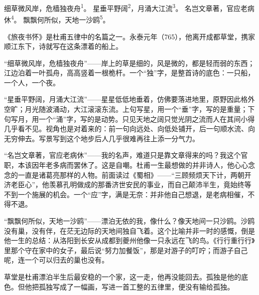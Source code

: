 
\begin{poem}
细草微风岸，危樯独夜舟\textsuperscript{1}。
星垂平野阔\textsuperscript{2}，月涌大江流\textsuperscript{3}。
名岂文章著，官应老病休\textsuperscript{4}。
飘飘何所似，天地一沙鸥\textsuperscript{5}。
\end{poem}

\begin{annotations}
\end{annotations}

\begin{appreciation}
《旅夜书怀》是杜甫五律中的名篇之一。永泰元年（765），他离开成都草堂，携家顺江东下，诗就写在这条漂着的船上。

“细草微风岸，危樯独夜舟”——岸上的草是细的，风是微的，都是轻而弱的东西；江边泊着一叶孤舟，高高竖着一根桅杆。一个“独”字，是整首诗的底色：一只船，一个人，一个夜。

“星垂平野阔，月涌大江流”——星星低低地垂着，仿佛要落进地里，原野因此格外空旷；月光随波涌动，大江滚滚东流。上句写星，用一个“垂”字，写的是重量；下句写月，用一个“涌”字，写的是动势。只见天地之阔只觉光阴之流而人在其间小得几乎看不见。视角也是对着来的：前一句向远处、向低处铺开，后一句顺水流、向无穷伸去。写景写到这个地步后人几乎很难再往上添一分气力。

“名岂文章著，官应老病休”——我的名声，难道只是靠文章得来的吗？我这个官职，本该因年老多病而罢休了。这是自嘲。杜甫一生最想做的并非诗人，他心心念念的一直是诸葛亮那样的人物。前面读过《蜀相》——“三顾频烦天下计，两朝开济老臣心”，他羡慕孔明做成的那番济世安民的事业，而自己颠沛半生，竟始终等不到一个施展的机会。一个“应”字，满是无奈：并非他自己想退，是老病相催，不得不退。

“飘飘何所似，天地一沙鸥”——漂泊无依的我，像什么？像天地间一只沙鸥。沙鸥没有巢，没有伴，在茫无边际的天地间独自飞着。这个比喻并非一时的感慨，倒是他一生的总结：从洛阳到长安从成都到夔州他像一只永远在飞的鸟。《行行重行行》里那个守在家中的女子，最后说“努力加餐饭”，那是对游子的叮咛；而游子自己呢，连一个可以归去的巢也没有。

草堂是杜甫漂泊半生后最安稳的一个家，这一走，他再没能回去。孤独是他的底色。但他把孤独写成了一幅画，写进一首工整的五律里，便没有输给孤独。
\end{appreciation}
